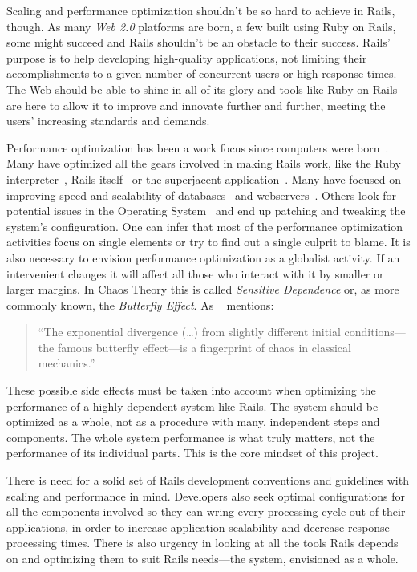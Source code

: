Scaling and performance optimization shouldn't be so hard to achieve in Rails, though. As many \textit{Web 2.0} platforms are born, a few built using Ruby on Rails, some might succeed and Rails shouldn't be an obstacle to their success. Rails' purpose is to help developing high-quality applications, not limiting their accomplishments to a given number of concurrent users or high response times. The Web should be able to shine in all of its glory and tools like Ruby on Rails are here to allow it to improve and innovate further and further, meeting the users' increasing standards and demands.

Performance optimization has been a work focus since computers were born~\cite{mass_memory_system_optimization}. Many have optimized all the gears involved in making Rails work, like the Ruby interpreter~\cite{yarv}, Rails itself~\cite{rails_merb_merge_performance} or the superjacent application~\cite{scaling_rails_bottomup,vaporware_to_awesome,rebuilding_scaling_yellowpages,5tips_scale_ror}. Many have focused on improving speed and scalability of databases~\cite{performance_analysis_db_arch} and webservers~\cite{webserver_scheduling}. Others look for potential issues in the Operating System~\cite{unix_os_comparison, architecture_impact_os} and end up patching and tweaking the system's configuration. One can infer that most of the performance optimization activities focus on single elements or try to find out a single culprit to blame. It is also necessary to envision performance optimization as a globalist activity. If an intervenient changes it will affect all those who interact with it by smaller or larger margins. In Chaos Theory this is called \textit{Sensitive Dependence} or, as more commonly known, the \textit{Butterfly Effect}. As ~\cite{butterfly_effect_quote} mentions:
\begin{quote}
  ``The exponential divergence (\ldots) from slightly different initial conditions---the famous butterfly effect---is a fingerprint of chaos in classical mechanics.''
\end{quote}
These possible side effects must be taken into account when optimizing the performance of a highly dependent system like Rails. The system should be optimized as a whole, not as a procedure with many, independent steps and components. The whole system performance is what truly matters, not the performance of its individual parts. This is the core mindset of this project.

There is need for a solid set of Rails development conventions and guidelines with scaling and performance in mind. Developers also seek optimal configurations for all the components involved so they can wring every processing cycle out of their applications, in order to increase application scalability and decrease response processing times. There is also urgency in looking at all the tools Rails depends on and optimizing them to suit Rails needs---the system, envisioned as a whole.


